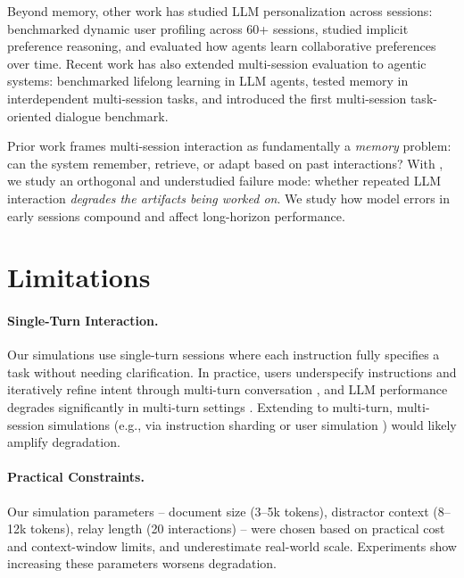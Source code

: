 \documentclass{article} %
\begin{document}
Beyond memory, other work has studied LLM personalization across sessions: \citet{Jiang2025KnowMR} benchmarked dynamic user profiling across 60+ sessions, \citet{Li2025TowardMP} studied implicit preference reasoning, and \citet{Mehri2026MultiSessionCollabLU} evaluated how agents learn collaborative preferences over time. Recent work has also extended multi-session evaluation to agentic systems: \citet{Zheng2025LifelongAgentBenchEL} benchmarked lifelong learning in LLM agents, \citet{He2026MemoryArenaBA} tested memory in interdependent multi-session tasks, and \citet{Du2025MemGuideIM} introduced the first multi-session task-oriented dialogue benchmark.

Prior work frames multi-session interaction as fundamentally a \textit{memory} problem: can the system remember, retrieve, or adapt based on past interactions? With \benchmark{}, we study an orthogonal and understudied failure mode: whether repeated LLM interaction \textit{degrades the artifacts being worked on}. We study how model errors in early sessions compound and affect long-horizon performance.

\section{Limitations} \label{sec:limitations}

\vspace{-0.5\intextsep}
\paragraph{Single-Turn Interaction.} Our simulations use single-turn sessions where each instruction fully specifies a task without needing clarification. In practice, users underspecify instructions and iteratively refine intent through multi-turn conversation \citep{Herlihy2024OnOM,kim2026discoverllm}, and LLM performance degrades significantly in multi-turn settings \citep{Laban2025LLMsGL}. Extending \benchmark{} to multi-turn, multi-session simulations (e.g., via instruction sharding or user simulation \citep{naous2025flipping}) would likely amplify degradation.

\vspace{-0.5\intextsep}
\paragraph{Practical Constraints.} Our simulation parameters -- document size (3--5k tokens), distractor context (8--12k tokens), relay length (20 interactions) -- were chosen based on practical cost and context-window limits, and underestimate real-world scale. Experiments show increasing these parameters worsens degradation.
\end{document}

